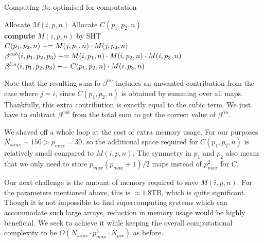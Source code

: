 \begin{algorithm}[htbp]
	\caption{Computing $\beta$s: optimised for computation}
	\label{alg:beta_second_attempt}
	\begin{algorithmic}[1] %
		\State Allocate $M(i,p,n)$ 
		\State Allocate $C(p_1,p_2,n)$ 
		\\
				\State \textbf{compute} $M(i,p,n)$ by SHT
			\EndFor
		\EndFor {}
		\\
					\State $C(p_1,p_2,n) \mathrel{+}= M(j,p_1,n) \cdot M(j,p_2,n)$
				\EndFor
			\EndFor
		\EndFor {}
		\\
					\State $\beta^{cub}(i, p_1, p_2, p_3) \mathrel{+}= M(i, p_1, n) \cdot M(i, p_2, n) \cdot M(i, p_3, n)$
					\State $\beta^{lin}(i, p_1, p_2, p_3) \mathrel{+}= C(p_1, p_2, n) \cdot M(i, p_3, n)$
				\EndFor
			\EndFor
		\EndFor
	\end{algorithmic}
\end{algorithm}

Note that the resulting sum fo $\beta^{lin}$ includes an unwanted contribution from the case where $j=i$, since $C(p_1,p_2,n)$ is obtained by summing over all maps. Thankfully, this extra contribution is exactly equal to the cubic term. We just have to subtract $\beta^{cub}$ from the total sum to get the correct value of $\beta^{lin}$.

We shaved off a whole loop at the cost of extra memory usage. For our purposes $N_{sims} \sim 150 > p_{max} = 30$, so the additional space required for $C(p_1,p_2,n)$ is relatively small compared to $M(i,p,n)$. The symmetry in $p_1$ and $p_2$ also means that we only need to store $p_{max}(p_{max}+1)/2$ maps instead of $p_{max}^2$ for $C$.

Our next challenge is the amount of memory required to save $M(i,p,n)$. For the parameters mentioned above, this is $\approx 1.8$TB, which is quite significant. Though it is not impossible to find supercomputing systems which can accommodate such large arrays, reduction in memory usage would be highly beneficial. We seek to achieve it while keeping the overall computational complexity to be $O(N_{sims} \cdot p_{max}^3 \cdot N_{pix})$ as before.

